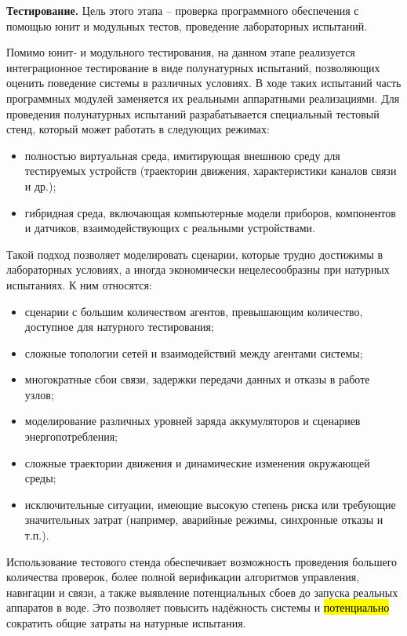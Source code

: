 \textbf{Тестирование.} Цель этого этапа -- проверка программного
обеспечения с помощью юнит и модульных тестов, проведение лабораторных
испытаний.

Помимо юнит‑ и модульного тестирования, на данном этапе реализуется
интеграционное тестирование в виде полунатурных испытаний, позволяющих
оценить поведение системы в различных условиях. В ходе таких испытаний
часть программных модулей заменяется их реальными аппаратными
реализациями. Для проведения полунатурных испытаний разрабатывается
специальный тестовый стенд, который может работать в следующих режимах:

\begin{itemize}
\item
  полностью виртуальная среда, имитирующая внешнюю среду для тестируемых
  устройств (траектории движения, характеристики каналов связи и др.);
\item
  гибридная среда, включающая компьютерные модели приборов, компонентов
  и датчиков, взаимодействующих с реальными устройствами.
\end{itemize}

Такой подход позволяет моделировать сценарии, которые трудно достижимы в
лабораторных условиях, а иногда экономически нецелесообразны при
натурных испытаниях. К ним относятся:

\begin{itemize}
\item
  сценарии с большим количеством агентов, превышающим количество,
  доступное для натурного тестирования;
\item
  сложные топологии сетей и взаимодействий между агентами системы;
\item
  многократные сбои связи, задержки передачи данных и отказы в работе
  узлов;
\item
  моделирование различных уровней заряда аккумуляторов и сценариев
  энергопотребления;
\item
  сложные траектории движения и динамические изменения окружающей среды;
\item
  исключительные ситуации, имеющие высокую степень риска или требующие
  значительных затрат (например, аварийные режимы, синхронные отказы и
  т.п.).
\end{itemize}

Использование тестового стенда обеспечивает возможность проведения
большего количества проверок, более полной верификации алгоритмов
управления, навигации и связи, а также выявление потенциальных сбоев до
запуска реальных аппаратов в воде. Это позволяет повысить надёжность
системы и \hl{потенциально} сократить общие затраты на натурные
испытания.

